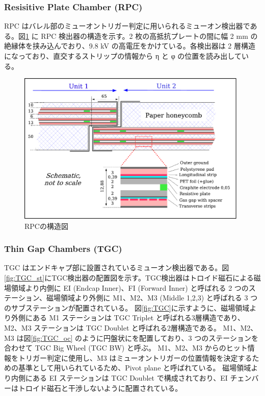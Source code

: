 \subsubsection{Resisitive Plate Chamber (RPC)}
RPC はバレル部のミューオントリガー判定に用いられるミューオン検出器である。図\ref{fig:RPC} に RPC 検出器の構造を示す。2 枚の高抵抗プレートの間に幅 2 mm の絶縁体を挟み込んでおり、9.8 kV の高電圧をかけている。各検出器は 2 層構造になっており、直交するストリップの情報から η と φ の位置を読み出している。

\begin{figure}[tb]
  \centering
  \includegraphics[clip, width=11cm]{fig/2/RPC_structure.pdf}
  \caption{RPCの構造図}
  \label{fig:RPC}
\end{figure}

\subsubsection{Thin Gap Chambers (TGC)}
TGC はエンドキャプ部に設置されているミューオン検出器である。図\ref{fig:TGC_st}にTGC検出器の配置図を示す。TGC検出器はトロイド磁石による磁場領域より内側に EI (Endcap Inner)、FI (Forward Inner)  と呼ばれる 2 つのステーション、磁場領域より外側に M1、M2、M3 (Middle 1,2,3) と呼ばれる 3 つのサブステーションが配置されている。
図\ref{fig:TGC}に示すように、磁場領域より外側にある M1 ステーションは TGC Triplet と呼ばれる3層構造であり、M2、M3 ステーションは TGC Doublet と呼ばれる2層構造である。
M1、M2、M3 は図\ref{fig:TGC_oc} のように円盤状にを配置しており、3 つのステーションを合わせて TGC Big Wheel (TGC BW) と呼ぶ。
M1、M2、M3 からのヒット情報をトリガー判定に使用し、M3 はミューオントリガーの位置情報を決定するための基準として用いられているため、Pivot plane と呼ばれている。
磁場領域より内側にある EI ステーションは TGC Doublet で構成されており、EI チェンバーはトロイド磁石と干渉しないように配置されている。

